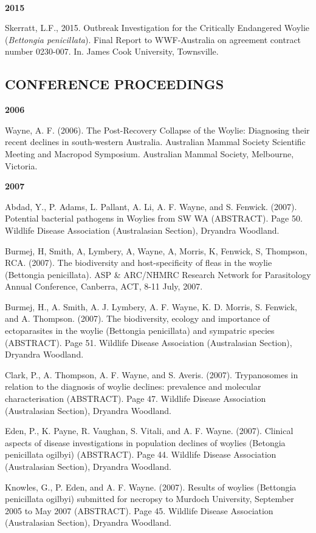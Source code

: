 \documentclass[version=last,
    paper=a4,                               %
    10pt,                                   %
    dvipsnames,
    oneside,                              %
    headings=openany,                       %
    open=any,
    BCOR=7mm,                               %
    DIV=15,     %
]{scrbook}
\begin{document}
~

\textbf{2015}

Skerratt, L.F., 2015. Outbreak Investigation for the Critically
Endangered Woylie (\emph{Bettongia penicillata}). Final Report to
WWF-Australia on agreement contract number 0230-007. In. James Cook
University, Townsville.

\subsection{CONFERENCE PROCEEDINGS}

\textbf{2006}

Wayne, A. F. (2006). The Post-Recovery Collapse of the Woylie:
Diagnosing their recent declines in south-western Australia. Australian
Mammal Society Scientific Meeting and Macropod Symposium. Australian
Mammal Society, Melbourne, Victoria.

\textbf{2007}

Abdad, Y., P. Adams, L. Pallant, A. Li, A. F. Wayne, and S. Fenwick.
(2007). Potential bacterial pathogens in Woylies from SW WA (ABSTRACT).
Page 50. Wildlife Disease Association (Australasian Section), Dryandra
Woodland.

Burmej, H, Smith, A, Lymbery, A, Wayne, A, Morris, K, Fenwick, S,
Thompson, RCA. (2007). The biodiversity and host-specificity of fleas in
the woylie (Bettongia penicillata). ASP \& ARC/NHMRC Research Network
for Parasitology Annual Conference, Canberra, ACT, 8-11 July, 2007.

Burmej, H., A. Smith, A. J. Lymbery, A. F. Wayne, K. D. Morris, S.
Fenwick, and A. Thompson. (2007). The biodiversity, ecology and
importance of ectoparasites in the woylie (Bettongia penicillata) and
sympatric species (ABSTRACT). Page 51. Wildlife Disease Association
(Australasian Section), Dryandra Woodland.

Clark, P., A. Thompson, A. F. Wayne, and S. Averis. (2007). Trypanosomes
in relation to the diagnosis of woylie declines: prevalence and
molecular characterisation (ABSTRACT). Page 47. Wildlife Disease
Association (Australasian Section), Dryandra Woodland.

Eden, P., K. Payne, R. Vaughan, S. Vitali, and A. F. Wayne. (2007).
Clinical aspects of disease investigations in population declines of
woylies (Betongia penicillata ogilbyi) (ABSTRACT). Page 44. Wildlife
Disease Association (Australasian Section), Dryandra Woodland.

Knowles, G., P. Eden, and A. F. Wayne. (2007). Results of woylies
(Bettongia penicillata ogilbyi) submitted for necropsy to Murdoch
University, September 2005 to May 2007 (ABSTRACT). Page 45. Wildlife
Disease Association (Australasian Section), Dryandra Woodland.
\end{document}
